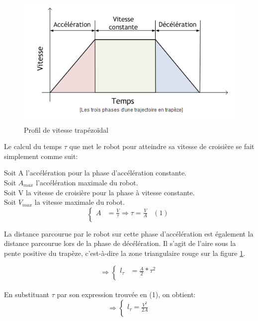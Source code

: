 \documentclass[a4paper,11pt]{article}
\begin{document}
\begin{figure}[H]
    \centering
    \includegraphics[scale = 1]{Profile_trapeze.png}
    \caption{Profil de vitesse trapézoïdal \cite{noauthor_construction_nodate}}
    \label{fig:trapèze}
\end{figure}

Le calcul du temps $\tau$ que met le robot pour atteindre sa vitesse de croisière se fait simplement comme suit:
\newline

\noindent Soit A l'accélération pour la phase d'accélération constante.\\
Soit $A_{max}$ l'accélération maximale du robot.\\
Soit V la vitesse de croisière pour la phase à vitesse constante.\\
Soit $V_{max}$ la vitesse maximale du robot.
\begin{equation*}
    \left\{
        \begin{aligned}
            A & = \frac{V}{\tau} \Rightarrow \tau = \frac{V}{A}  & (1)\\ 
           \end{aligned}
    \right.
\end{equation*}

La distance parcourue par le robot sur cette phase d'accélération est également la distance parcourue lors de la phase de décélération. Il s'agit de l'aire sous la pente positive du trapèze, c'est-à-dire la zone triangulaire rouge sur la figure \ref{fig:trapèze}.

\begin{equation*}
    \Rightarrow\left\{
        \begin{aligned}
        l_{\tau} & = \frac{A}{2}*\tau^2\\
           \end{aligned}
    \right.
\end{equation*}\\
En substituant $\tau$ par son expression trouvée en (1), on obtient:
\begin{equation*}
    \Rightarrow\left\{
        \begin{aligned}
        l_{\tau} = \frac{V^2}{2A}\\
           \end{aligned}
    \right.
\end{equation*}
\end{document}
